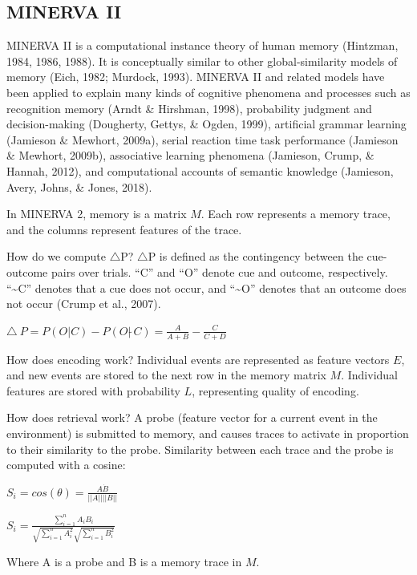 \documentclass[
  english,
  man,floatsintext]{apa6}
\begin{document}
\hypertarget{minerva-ii}{%
\subsection{MINERVA II}\label{minerva-ii}}

MINERVA II is a computational instance theory of human memory (Hintzman, 1984, 1986, 1988). It is conceptually similar to other global-similarity models of memory (Eich, 1982; Murdock, 1993). MINERVA II and related models have been applied to explain many kinds of cognitive phenomena and processes such as recognition memory (Arndt \& Hirshman, 1998), probability judgment and decision-making (Dougherty, Gettys, \& Ogden, 1999), artificial grammar learning (Jamieson \& Mewhort, 2009a), serial reaction time task performance (Jamieson \& Mewhort, 2009b), associative learning phenomena (Jamieson, Crump, \& Hannah, 2012), and computational accounts of semantic knowledge (Jamieson, Avery, Johns, \& Jones, 2018).

In MINERVA 2, memory is a matrix \(M\). Each row represents a memory trace, and the columns represent features of the trace.

How do we compute \(\triangle\)P? \(\triangle\)P is defined as the contingency between the cue-outcome pairs over trials. \enquote{C} and \enquote{O} denote cue and outcome, respectively. \enquote{\textasciitilde C} denotes that a cue does not occur, and \enquote{\textasciitilde O} denotes that an outcome does not occur (Crump et al., 2007).

\(\triangle\ P = P(O|C) - P(O| \tilde\ C) = \frac{A}{A+B} - \frac{C}{C+D}\)

How does encoding work? Individual events are represented as feature vectors \(E\), and new events are stored to the next row in the memory matrix \(M\). Individual features are stored with probability \(L\), representing quality of encoding.

How does retrieval work? A probe (feature vector for a current event in the environment) is submitted to memory, and causes traces to activate in proportion to their similarity to the probe. Similarity between each trace and the probe is computed with a cosine:

\(S_i = cos(\theta) = \frac{A \dot B}{||A|| ||B||}\)

\(S_i = \frac{\sum_{i=1}^n A_iB_i}{\sqrt{\sum_{i=1}^n A_i^2}\sqrt{\sum_{i=1}^n B_i^2}}\)

Where A is a probe and B is a memory trace in \(M\).
\end{document}
